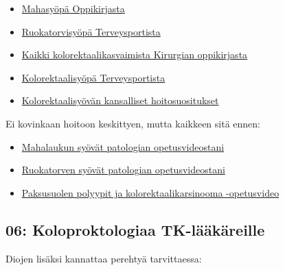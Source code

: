 \documentclass[
]{book}
\providecommand{\tightlist}{%
  \setlength{\itemsep}{0pt}\setlength{\parskip}{0pt}}
\begin{document}
\begin{itemize}
\tightlist
\item
  \href{https://www.oppiportti.fi/oppikirjat/kia00557}{Mahasyöpä Oppikirjasta}
\item
  \href{https://www.terveysportti.fi/apps/dtk/ltk/article/ykt02084/}{Ruokatorvisyöpä Terveysportista}
\item
  \href{https://www.oppiportti.fi/oppikirjat/kia00586}{Kaikki kolorektaalikasvaimista Kirurgian oppikirjasta}
\item
  \href{https://www.terveysportti.fi/apps/dtk/ltk/article/ykt01866/}{Kolorektaalisyöpä Terveysportista}
\item
  \href{https://www.terveysportti.fi/apps/dtk/ltk/article/hsu00007/}{Kolorektaalisyövän kansalliset hoitosuositukset}
\end{itemize}

Ei kovinkaan hoitoon keskittyen, mutta kaikkeen sitä ennen:

\begin{itemize}
\tightlist
\item
  \href{https://youtu.be/4JpulGfwCh4?si=EjwC-_iyRZzDXHXz&t=2784}{Mahalaukun syövät patologian opetusvideostani}
\item
  \href{https://youtu.be/adbNA6vdZLQ?si=FLZq-7btXuJbj_6l&t=1683}{Ruokatorven syövät patologian opetusvideostani}
\item
  \href{https://youtu.be/4VHXfISmPto?si=FOxG6WXaWu3uWGwI}{Paksusuolen polyypit ja kolorektaalikarsinooma -opetusvideo}
\end{itemize}

\subsection{06: Koloproktologiaa TK-lääkäreille}\label{Koloproktologiaa-TK-laakareille}

Diojen lisäksi kannattaa perehtyä tarvittaessa:
\end{document}
